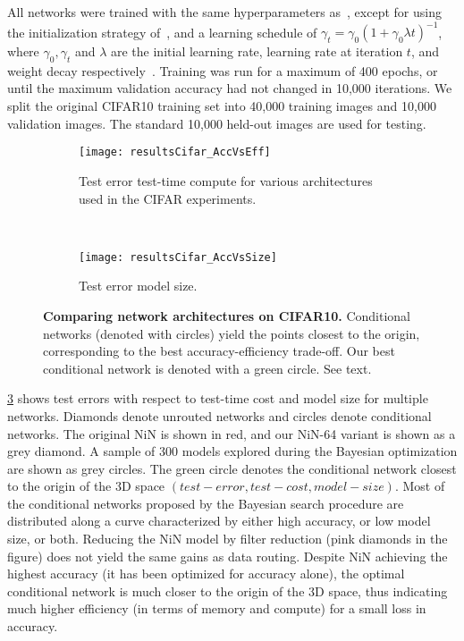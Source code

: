 \documentclass[thesis]{subfiles}
\begin{document}
	All networks were trained with the same hyperparameters as~\citep{Lin2013NiN}, 
	except for using the initialization strategy of~\citep{He2015b}, 
	and a learning schedule of $\gamma_t = \gamma_0(1+\gamma_0\lambda t)^{-1}$, where $\gamma_0,\gamma_t$ and $\lambda$ are the initial learning rate, learning rate at iteration $t$, and weight decay respectively~\citep{Bottou2012sgdtricks}. Training was run for a maximum of 400 epochs, or until the maximum validation accuracy had not changed in 10,000 iterations. 
	We split the original CIFAR10 training set into 40,000 training images and 
	10,000 validation images. 
	The standard 10,000 held-out images are used for testing.
	
	
	\begin{figure}[tbp] 
		\centering
		\begin{subfigure}[b]{0.95\linewidth}
			\centering
			\texttt{[image: resultsCifar\_AccVsEff]}
			\caption{Test error \vs test-time compute for various architectures used in the CIFAR experiments.}\label{fig:resultsCifar_AccVsEff}
		\end{subfigure}
		~
		\begin{subfigure}[b]{0.95\linewidth}
			\centering
			\texttt{[image: resultsCifar\_AccVsSize]}
			\caption{Test error \vs model size.}\label{fig:resultsCifar_AccVsSize}
		\end{subfigure}
		\caption[Comparing network architectures on CIFAR10.]{\textbf{Comparing network architectures on CIFAR10.} Conditional networks (denoted with circles) yield the points closest to the origin, corresponding to the best accuracy-efficiency trade-off. Our best conditional network is denoted with a green circle. See text.}\label{fig:Cifar_results}
	\end{figure}
	\cref{fig:Cifar_results} shows test errors with respect to test-time cost and model size for multiple networks.
	Diamonds denote unrouted networks and circles denote conditional networks. 
	The original NiN is shown in red, and our NiN-64 variant is shown as a grey diamond.
	A sample of 300 models explored during the Bayesian optimization are shown as grey circles.
	The green circle denotes the conditional network closest to the origin of the 
	3D space $(test-error,test-cost,model-size)$.
	Most of the conditional networks proposed by the Bayesian search procedure are distributed along a curve characterized by either high accuracy, or low model size, or both. 
	Reducing the NiN model by filter reduction (pink diamonds in the figure) does not yield the same gains as data routing.
	Despite NiN achieving the highest accuracy (it has been optimized for accuracy alone), the optimal conditional network is much closer to the origin of the 3D space, thus indicating much higher efficiency (in terms of memory and compute) for a small loss in accuracy.
	
\end{document}
